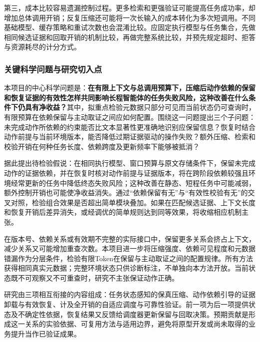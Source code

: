 第三，成本比较容易遗漏控制过程。更多检索和更强验证可能提高任务成功率，却增加总体调用开销；反复压缩还可能将一次长输入的成本转化为多次短调用。不同基础模型、缓存策略和重试次数也会混淆比较。应固定执行模型与任务集合，先做相同候选证据和回取开销的机制比较，再做完整系统比较，并预先规定超时、拒答与资源耗尽的计分方式。

\subsubsection{关键科学问题与研究切入点}
本项目的中心科学问题是：\textbf{在有限上下文与总调用预算下，压缩后动作依赖的保留和恢复证据的有效性怎样共同影响长程智能体的任务失败风险，这种改善在什么条件下仍具有净收益？}其中，拟重点检验元数据只部分可见而当前状态仍可查询时，有限预算在依赖保留与主动取证之间应如何配置。围绕这一问题提出三个子问题：未完成动作所依赖的约束能否比文本显著性更准确地识别应保留信息？恢复时结合动作前提与当前环境版本，能否降低过期证据驱动的操作失败？额外压缩、检索和校验开销在何种任务长度、依赖跨度及更新频率下能够被抵消？

据此提出待检验假说：在相同执行模型、窗口预算与原文存储条件下，保留未完成动作的证据依赖，并在恢复时核对动作前提与证据版本，将在跨阶段依赖较强且环境经常更新的任务中降低终态失败风险；这种改善在静态、短程任务中可能减弱，额外控制开销也可能使净收益消失。通过“依赖保留有无”与“有效性校验有无”的交叉对照，检验组合效果是否超出简单模块叠加。如果在匹配候选证据、上下文长度和恢复开销后差异消失，或经调优的简单规则达到同等效果，将收缩相应机制主张。

在版本号、依赖关系或有效期不完整的实际接口中，保留更多关系会挤占上下文，减少关系又可能增加重查次数。本项目进一步将压缩强度、依赖可见程度和元数据错漏作为分层条件，检验有限Token在保留与主动取证之间的配置规律。所有方法获得相同真实元数据；完整环境状态只供诊断标注，不单独向本方法开放。当前状态既不可观察又不可重查时，研究不主张保证动作正确。

研究由三项相互衔接的内容组成：任务状态感知的保真压缩、动作依赖引导的证据卸载与有效恢复、计及全开销的自适应调度与可靠性验证。前一项为后一项提供状态及不确定性依据，恢复结果又反馈给调度器更新保留与回取决策。预期贡献是形成这一关系的实验依据、可复用方法与适用边界，避免将原型开发或尚未取得的业务提升当作已验证成果。
